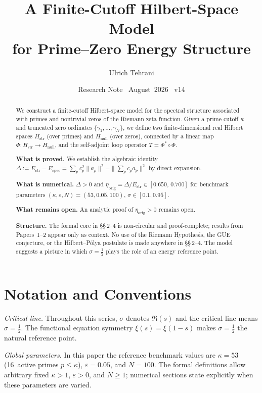 \documentclass[11pt]{article}
\title{\vspace{-1.5em}\bfseries A Finite-Cutoff Hilbert-Space Model\\[0.4em]
\large for Prime--Zero Energy Structure}
\author{Ulrich Tehrani}
\date{Research Note \textperiodcentered\ August~2026 \textperiodcentered\ v14}
\newcommand{\Hstr}{H_{\mathrm{str}}}
\newcommand{\Hnull}{H_{\mathrm{null}}}
\newcommand{\Estr}{E_{\mathrm{str}}}
\newcommand{\Espec}{E_{\mathrm{spec}}}
\newcommand{\etaorig}{\eta_{\mathrm{orig}}}
\begin{document}
\maketitle

\begin{abstract}
We construct a finite-cutoff Hilbert-space model for the spectral structure
associated with primes and nontrivial zeros of the Riemann zeta function.
Given a prime cutoff $\kappa$ and truncated zero ordinates
$\{\gamma_1,\ldots,\gamma_N\}$, we define two finite-dimensional real
Hilbert spaces $\Hstr$ (over primes) and $\Hnull$ (over zeros),
connected by a linear map $\Phi\colon\Hstr\to\Hnull$, and the
self-adjoint loop operator $T = \Phi^*\circ\Phi$.

\textbf{What is proved.}
We establish the algebraic identity
$\Delta := \Estr - \Espec
 = \sum_p c_p^2\|a_p\|^2 - \|\sum_p c_p a_p\|^2$
by direct expansion.

\textbf{What is numerical.}
$\Delta > 0$ and
$\etaorig = \Delta/\Estr \in [0.650,\,0.700]$ for benchmark parameters
$(\kappa,\varepsilon,N)=(53,0.05,100)$, $\sigma\in[0.1,0.95]$.

\textbf{What remains open.}
An analytic proof of $\etaorig>0$ remains open.

\textbf{Structure.}
The formal core in \S\S\,2--4 is non-circular and proof-complete;
results from Papers~1--2 appear only as context.
No use of the Riemann Hypothesis, the GUE conjecture,
or the Hilbert--P\'olya postulate is made anywhere in \S\S\,2--4.
The model suggests a picture in which $\sigma=\tfrac12$ plays
the role of an energy reference point.
\end{abstract}

\vspace{2em}

\section*{Notation and Conventions}
\label{sec:notation}

\emph{Critical line.}
Throughout this series, $\sigma$ denotes $\Re(s)$ and the critical
line means $\sigma=\tfrac12$. The functional equation symmetry
$\xi(s)=\xi(1-s)$ makes $\sigma=\tfrac12$ the natural reference
point.

\medskip
\emph{Global parameters.}
In this paper the reference benchmark values are
$\kappa=53$ (16~active primes $p\leq\kappa$),
$\varepsilon=0.05$, and $N=100$.
The formal definitions allow arbitrary fixed $\kappa>1$,
$\varepsilon>0$, and $N\geq 1$; numerical sections state
explicitly when these parameters are varied.
\end{document}
